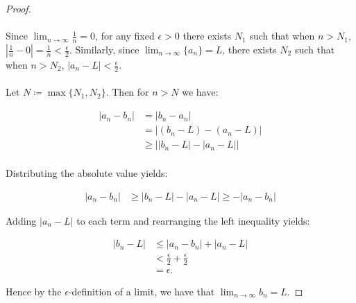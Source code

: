     \begin{proof}\ \\\\
        Since $\lim_{n \rightarrow \infty}{\frac{1}{n}} = 0$, for any fixed 
        $\epsilon > 0$ there exists $N_1$ such that when $n > N_1$,
        $|\frac{1}{n} - 0| = \frac{1}{n} < \frac{\epsilon}{2}$. Similarly,
        since $\lim_{n \rightarrow \infty}{\{a_n\}} = L$, there exists $N_2$
        such that when $n > N_2$, $|a_n - L| < \frac{\epsilon}{2}$. \\\\
        
        Let $N \coloneqq \max{\{N_1, N_2\}}$. Then for $n > N$ we have:


        \begin{align*}
            |a_n - b_n| &= |b_n - a_n| \\
                        &= |(b_n - L) - (a_n - L)| \\
                        &\ge \bigl| |b_n - L| - |a_n - L|\bigl| \\
        \end{align*}

        Distributing the absolute value yields:


        \begin{align*}
            |a_n - b_n| &\ge |b_n - L| - |a_n - L| \ge -|a_n - b_n|
        \end{align*}

        Adding $|a_n - L|$ to each term and rearranging the left inequality 
        yields:

        \begin{align*}
            |b_n - L| &\le |a_n - b_n| + |a_n - L| \\
                      &< \frac{\epsilon}{2} + \frac{\epsilon}{2} \\
                      &= \epsilon.
        \end{align*}

        Hence by the $\epsilon$-definition of a limit, we have that 
        $\lim_{n \rightarrow \infty}{b_n} = L$.

    \end{proof}